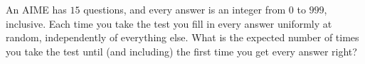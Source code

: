 An AIME has $15$ questions, and every answer is an integer from $0$ to $999$, inclusive. Each time you take the test you fill in every answer uniformly at random, independently of everything else. What is the expected number of times you take the test until (and including) the first time you get every answer right?
